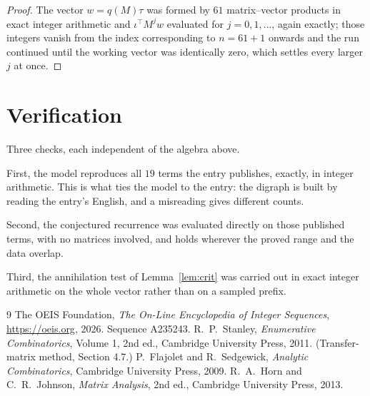 \documentclass[11pt,a4paper]{article}
\theoremstyle{plain}
\theoremstyle{definition}
\begin{document}
\begin{proof}
The vector $w=q(M)\tau$ was formed by $61$ matrix--vector products in exact integer
arithmetic and $\iota^{\!\top}M^{j}w$ evaluated for $j=0,1,\dots$, again exactly; those
integers vanish from the index corresponding to $n=61+1$ onwards and the run continued
until the working vector was identically zero, which settles every larger $j$ at once.
\end{proof}

\section{Verification}

Three checks, each independent of the algebra above.

First, the model reproduces all $19$ terms the entry publishes, exactly, in integer
arithmetic. This is what ties the model to the entry: the digraph is built by reading the
entry's English, and a misreading gives different counts.

Second, the conjectured recurrence was evaluated directly on those published terms, with no
matrices involved, and holds wherever the proved range and the data overlap.

Third, the annihilation test of Lemma~\ref{lem:crit} was carried out in exact integer
arithmetic on the whole vector rather than on a sampled prefix.

\begin{thebibliography}{9}
 The OEIS Foundation, \emph{The On-Line Encyclopedia of Integer
Sequences}, \url{https://oeis.org}, 2026. Sequence A235243.
 R.~P.~Stanley, \emph{Enumerative Combinatorics}, Volume 1, 2nd ed.,
Cambridge University Press, 2011. (Transfer-matrix method, Section 4.7.)
 P.~Flajolet and R.~Sedgewick, \emph{Analytic Combinatorics}, Cambridge
University Press, 2009.
 R.~A.~Horn and C.~R.~Johnson, \emph{Matrix Analysis}, 2nd ed., Cambridge
University Press, 2013.
\end{thebibliography}
\end{document}
